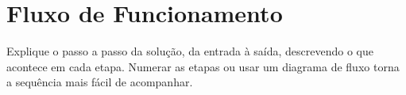 \section{Fluxo de Funcionamento}

Explique o passo a passo da solução, da entrada à saída, descrevendo o que
acontece em cada etapa. Numerar as etapas ou usar um diagrama de fluxo torna a
sequência mais fácil de acompanhar.

